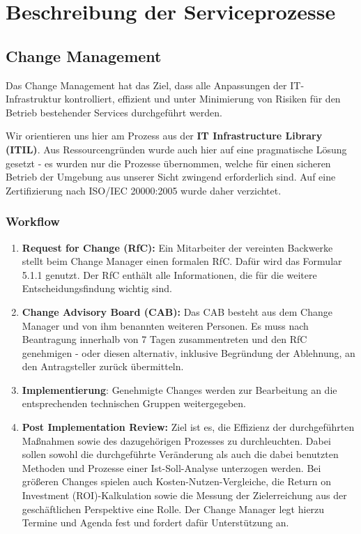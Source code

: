 \documentclass[]{article}
\begin{document}
\section{Beschreibung der
Serviceprozesse}\label{beschreibung-der-serviceprozesse}

\subsection{Change Management}\label{change-management}

Das Change Management hat das Ziel, dass alle Anpassungen der
IT-Infrastruktur kontrolliert, effizient und unter Minimierung von
Risiken für den Betrieb bestehender Services durchgeführt werden.

Wir orientieren uns hier am Prozess aus der \textbf{IT Infrastructure
Library (ITIL)}. Aus Ressourcengründen wurde auch hier auf eine
pragmatische Lösung gesetzt - es wurden nur die Prozesse übernommen,
welche für einen sicheren Betrieb der Umgebung aus unserer Sicht
zwingend erforderlich sind. Auf eine Zertifizierung nach ISO/IEC
20000:2005 wurde daher verzichtet.

\subsubsection{Workflow}\label{workflow}

\begin{enumerate}
\def\labelenumi{\arabic{enumi}.}
\item
  \textbf{Request for Change (RfC):} Ein Mitarbeiter der vereinten
  Backwerke stellt beim Change Manager einen formalen RfC. Dafür wird
  das Formular 5.1.1 genutzt. Der RfC enthält alle Informationen, die
  für die weitere Entscheidungsfindung wichtig sind.
\item
  \textbf{Change Advisory Board (CAB):} Das CAB besteht aus dem Change
  Manager und von ihm benannten weiteren Personen. Es muss nach
  Beantragung innerhalb von 7 Tagen zusammentreten und den RfC
  genehmigen - oder diesen alternativ, inklusive Begründung der Ablehnung, an
  den Antragsteller zurück übermitteln.
\item
  \textbf{Implementierung}: Genehmigte Changes werden zur Bearbeitung an
  die entsprechenden technischen Gruppen weitergegeben.
\item
  \textbf{Post Implementation Review:} Ziel ist es, die Effizienz der
  durchgeführten Maßnahmen sowie des dazugehörigen Prozesses zu
  durchleuchten. Dabei sollen sowohl die durchgeführte Veränderung als
  auch die dabei benutzten Methoden und Prozesse einer Ist-Soll-Analyse
  unterzogen werden. Bei größeren Changes spielen auch
  Kosten-Nutzen-Vergleiche, die Return on Investment (ROI)-Kalkulation
  sowie die Messung der Zielerreichung aus der geschäftlichen
  Perspektive eine Rolle. Der Change Manager legt hierzu Termine und
  Agenda fest und fordert dafür Unterstützung an.
\end{enumerate}
\end{document}
